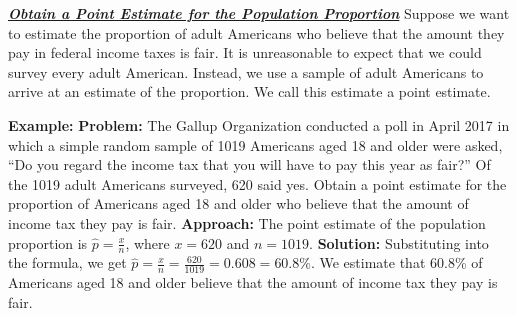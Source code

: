 \documentclass{report}
\begin{document}
    \bigbreak \noindent \bigbreak \noindent 
    \textbf{\textit{\underline{Obtain a Point Estimate for the Population Proportion}}}
    \bigbreak \noindent 
    Suppose we want to estimate the proportion of adult Americans who believe that the amount they pay in federal income taxes is fair. It is unreasonable to expect that we could survey every adult American. Instead, we use a sample of adult Americans to arrive at an estimate of the proportion. We call this estimate a point estimate.
    \bigbreak \noindent 
    \begin{mdframed}
      \textbf{Example: }
      \bigbreak \noindent 
      \textbf{Problem:}
      \bigbreak \noindent 
      The Gallup Organization conducted a poll in April 2017 in which a simple random sample of 1019 Americans aged 18 and older were asked, “Do you regard the income tax that you will have to pay this year as fair?” Of the 1019 adult Americans surveyed, 620 said yes. Obtain a point estimate for the proportion of Americans aged 18 and older who believe that the amount of income tax they pay is fair.
      \bigbreak \noindent 
      \textbf{Approach:}
      The point estimate of the population proportion is $\hat{p}=\frac{x}{n}$, where $x=620$ and $n=1019$.
      \bigbreak \noindent 
      \textbf{Solution:}
      \bigbreak \noindent 
      Substituting into the formula, we get $\hat{p}=\frac{x}{n}=\frac{620}{1019}=0.608=60.8\%$.
      \bigbreak \noindent 
        We estimate that 60.8\% of Americans aged 18 and older believe that the amount of income tax they pay is fair.
    \end{mdframed}
\end{document}
